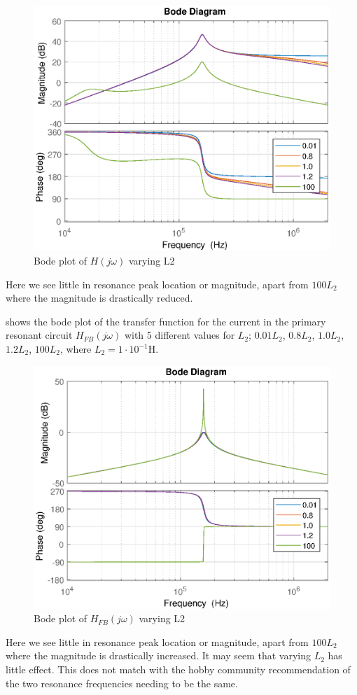 \begin{figure}[H]
    \centering
    \includegraphics[width=\textwidth]{img/CoilRigBode_L2.eps}
    \caption{Bode plot of $H(j\omega)$ varying L2}
    \label{fig:bode_l2}
\end{figure}

Here we see little in resonance peak location or magnitude, apart from $100 L_2$ where the magnitude is drastically reduced.

 shows the bode plot of the transfer function for the current in the primary resonant circuit $H_{FB}(j\omega)$ with 5 different values for $L_2$; $0.01 L_2$, $0.8 L_2$, $1.0 L_2$, $1.2 L_2$, $100 L_2$, where $L_2 = 1 \cdot 10^{-1}$H.
\begin{figure}[H]
    \centering
    \includegraphics[width=\textwidth]{img/FeedBackBode_L2.eps}
    \caption{Bode plot of $H_{FB}(j\omega)$ varying L2}
    \label{fig:fbbode_l2}
\end{figure}
Here we see little in resonance peak location or magnitude, apart from $100 L_2$ where the magnitude is drastically increased. It may seem that varying $L_2$ has little effect. This does not match with the hobby community recommendation of the two resonance frequencies needing to be the same.
